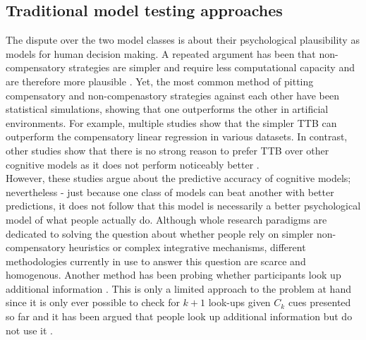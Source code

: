 \documentclass[10pt,letterpaper]{article}
\begin{document}
\subsection{Traditional model testing approaches}
The dispute over the two model classes is about their psychological plausibility as models for human decision making. A repeated argument has been that non-compensatory strategies are simpler and require less computational capacity and are therefore more plausible \citep{todd2000precis}. Yet, the most common method of pitting compensatory and non-compenastory strategies against each other have been statistical simulations, showing that one outperforms the other in artificial environments. For example, multiple studies show that the simpler TTB can outperform the compensatory linear regression \citep{czerlinski1999good} in various datasets. In contrast, other studies show that there is no strong reason to prefer TTB over other cognitive models as it does not perform noticeably better \citep{chater2003fast, schulz2014predict}.\\
However, these studies argue about the predictive accuracy of cognitive models; nevertheless - just because one class of models can beat another with better predictions, it does not follow that this model is necessarily a better psychological model of what people actually do. Although whole research paradigms are dedicated to solving the question about whether people rely on simpler non-compensatory heuristics or complex integrative mechanisms, different methodologies currently in use to answer this question are scarce and homogenous. Another method has been probing whether participants look up additional information \citep{newell2003empirical}. This is only a limited approach to the problem at hand  since it is only ever possible to check for $k+1$ look-ups given $C_k$ cues presented so far and it has been argued that people look up additional information but do not use it \citep{marewski2011using}.\\
\end{document}
